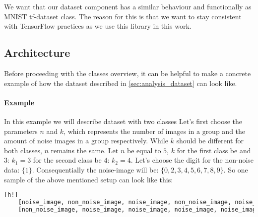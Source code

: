 We want that our dataset component has a similar behaviour and functionally
as MNIST tf-dataset class. The reason for this is that we want to stay
consistent with TensorFlow practices as we use this library in this work.





\subsection{Architecture}

Before proceeding with the classes overview, it can be helpful
to make a concrete example of how the dataset described in
\autoref{sec:analysis_dataset} can look like.

\paragraph{Example} In this example we will describe dataset with two classes
Let's first choose the parameters $n$ and $k$,
which represents the number of images in a group and the amount of noise images
in a group respectively. While $k$
should be different for both classes, $n$ remains the same.
Let $n$ be equal to $5$, $k$ for the first class be and $3$: $k_1 = 3$
for the second class be $4$: $k_2 = 4$. Let's choose the digit for the non-noise
data: $\{1\}$. Consequentially the noise-image will
be: $\{0, 2, 3, 4, 5, 6, 7, 8, 9\}$.
So one sample of the above mentioned setup can look like this:

\begin{lstlisting}[language=Python][h!]
	[noise_image, non_noise_image, noise_image, non_noise_image, noise_image ] # class 1
	[non_noise_image, noise_image, noise_image, noise_image, noise_image ] # class 2
\end{lstlisting}

